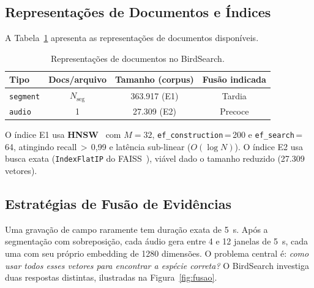 \documentclass[12pt]{article}
\begin{document}


\subsection{Representações de Documentos e Índices}
\label{sub:repr}

A Tabela~\ref{tab:repr} apresenta as representações de documentos disponíveis.

\begin{table}[ht]
\centering
\caption{Representações de documentos no BirdSearch.}
\label{tab:repr}
\begin{tabular}{lccc}
\toprule
\textbf{Tipo} & \textbf{Docs/arquivo} & \textbf{Tamanho (corpus)} & \textbf{Fusão indicada} \\
\midrule
\texttt{segment}   & $N_{\text{seg}}$ & 363.917 (E1) & Tardia  \\
\texttt{audio}     & 1                & 27.309 (E2)  & Precoce \\
\bottomrule
\end{tabular}
\end{table}

O índice E1 usa \textbf{HNSW}~\cite{malkov:20} com $M=32$,
\texttt{ef\_construction}\,=\,200 e \texttt{ef\_search}\,=\,64, atingindo
recall\,$>$\,0,99 e latência sub-linear ($O(\log N)$). O índice E2 usa busca
exata (\texttt{IndexFlatIP} do FAISS~\cite{johnson:21}), viável dado o tamanho
reduzido (27.309 vetores).

\subsection{Estratégias de Fusão de Evidências}
\label{sub:fusao}

Uma gravação de campo raramente tem duração exata de 5~s. Após a segmentação
com sobreposição, cada áudio gera entre 4 e 12 janelas de 5~s, cada uma com
seu próprio embedding de 1280 dimensões. O problema central é: \emph{como
usar todos esses vetores para encontrar a espécie correta?} O BirdSearch
investiga duas respostas distintas, ilustradas na Figura~\ref{fig:fusao}.
\end{document}
